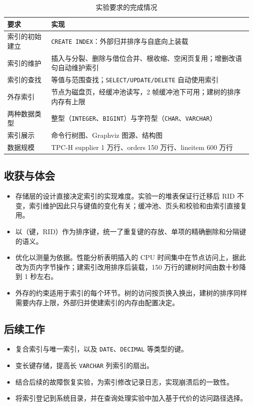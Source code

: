 \documentclass[11pt,a4paper]{ctexart}
\newcommand{\code}[1]{\texttt{#1}}
\begin{document}
\begin{table}[H]
  \centering
  \caption{实验要求的完成情况}
  \begin{tabularx}{\textwidth}{l X}
    \toprule
    要求 & 实现 \\
    \midrule
    索引的初始建立 & \code{CREATE INDEX}：外部归并排序与自底向上装载 \\
    索引的维护 & 插入与分裂、删除与借位合并、根收缩、空闲页复用；增删改语句自动维护索引 \\
    索引的查找 & 等值与范围查找；\code{SELECT/UPDATE/DELETE} 自动使用索引 \\
    外存索引 & 节点为磁盘页，经缓冲池读写，2 帧缓冲池下可用；建树的排序内存有上限 \\
    两种数据类型 & 整型（\code{INTEGER}、\code{BIGINT}）与字符型（\code{CHAR}、\code{VARCHAR}） \\
    索引展示 & 命令行树图、Graphviz 图源、结构图 \\
    数据规模 & TPC-H supplier 1 万行、orders 150 万行、lineitem 600 万行 \\
    \bottomrule
  \end{tabularx}
\end{table}

\subsection{收获与体会}

\begin{itemize}
  \item 存储层的设计直接决定索引的实现难度。实验一的堆表保证行迁移后 RID 不变，索引维护因此只与键值的变化有关；缓冲池、页头和校验和由索引直接复用。
  \item 以（键，RID）作为排序键，统一了重复键的存放、单项的精确删除和分隔键的语义。
  \item 优化以测量为依据。性能分析表明插入的 CPU 时间集中在节点访问上，据此改为页内字节操作；建索引改用排序后装载，150 万行的建树时间由数十秒降到 1 秒左右。
  \item 外存的约束适用于索引的每个环节。树的访问按页换入换出，建树的排序同样需要内存上限，外部归并使建索引的内存由配置决定。
\end{itemize}

\subsection{后续工作}

\begin{itemize}
  \item 复合索引与唯一索引，以及 \code{DATE}、\code{DECIMAL} 等类型的键。
  \item 变长键存储，提高长 \code{VARCHAR} 列索引的扇出。
  \item 结合后续的故障恢复实验，为索引修改记录日志，实现崩溃后的一致性。
  \item 将索引登记到系统目录，并在查询处理实验中加入基于代价的访问路径选择。
\end{itemize}
\end{document}
